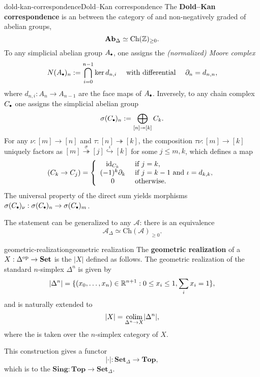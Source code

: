 \begin{topic}{dold-kan-correspondence}{Dold--Kan correspondence}
    The \textbf{Dold--Kan correspondence} is an  between the category of   and non-negatively graded  of abelian groups,
    \[ \textbf{Ab}_\Delta \simeq \text{Ch}(\mathbb{Z})_{\ge 0} . \]
    To any simplicial abelian group $A_\bdot$, one assigns the \textit{(normalized) Moore complex}
    \[ N(A_\bdot)_n := \bigcap_{i = 0}^{n - 1} \ker d_{n, i} \quad \text{ with differential } \quad \partial_n = d_{n, n}, \]
    where $d_{n, i} : A_n \to A_{n - 1}$ are the face maps of $A_\bdot$.
    Inversely, to any chain complex $C_\bdot$ one assigns the simplicial abelian group
    \[ \sigma(C_\bdot)_n := \bigoplus_{[n] \twoheadrightarrow [k]} C_k . \]
    For any $\nu : [m] \to [n]$ and $\tau : [n] \twoheadrightarrow [k]$, the composition $\tau\nu : [m] \to [k]$ uniquely factors as $[m] \overset{\sigma}{\twoheadrightarrow} [j] \overset{\iota}{\hookrightarrow} [k]$ for some $j \le m, k$, which defines a map
    \[ (C_k \to C_j) = \left\{ \begin{array}{cl} \text{id}_{C_k} & \textup{ if } j = k , \\ (-1)^k \partial_k & \textup{ if } j = k - 1 \textup{ and } \iota = d_{k,k} , \\ 0 & \textup{ otherwise}. \end{array} \right. \]
    The universal property of the direct sum yields morphisms $\sigma(C_\bdot)_\nu : \sigma(C_\bdot)_n \to \sigma(C_\bdot)_m$.
    
    The statement can be generalized to any  $\mathcal{A}$: there is an equivalence
    \[ \mathcal{A}_\Delta \simeq \text{Ch}(\mathcal{A})_{\ge 0} . \]
\end{topic}

\begin{topic}{geometric-realization}{geometric realization}
    The \textbf{geometric realization} of a  $X : \Delta^\textup{op} \to \textbf{Set}$ is the  $|X|$ defined as follows. The geometric realization of the standard $n$-simplex $\Delta^n$ is given by
    \[ |\Delta^n| = \{ (x_0, \ldots, x_n) \in \mathbb{R}^{n + 1} : 0 \le x_i \le 1, \sum_i x_i = 1 \} , \]
    and is naturally extended to
    \[ |X| = \underset{\Delta^n \to X}{\textup{colim}} |\Delta^n| , \]
    where the  is taken over the $n$-simplex category of $X$.
    
    This construction gives a functor
    \[ |\cdot| : \textbf{Set}_\Delta \to \textbf{Top} , \]
    which is  to the  $\textbf{Sing} : \textbf{Top} \to \textbf{Set}_\Delta$.
\end{topic}

